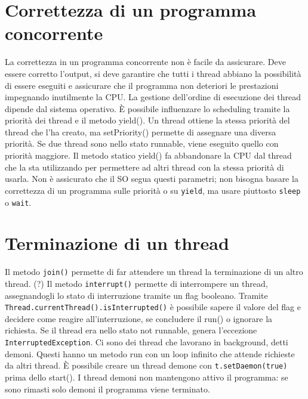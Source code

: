 \section{Correttezza di un programma concorrente}
La correttezza in un programma concorrente non è facile da assicurare. Deve essere corretto l'output, si deve garantire che tutti i thread abbiano la possibilità di essere eseguiti e assicurare che il programma non deteriori le prestazioni impegnando inutilmente la CPU.
La gestione dell'ordine di esecuzione dei thread dipende dal sistema operativo. È possibile influenzare lo scheduling tramite la priorità dei thread e il metodo yield().
Un thread ottiene la stessa priorità del thread che l'ha creato, ma setPriority() permette di assegnare una diversa priorità. Se due thread sono nello stato runnable, viene eseguito quello con priorità maggiore.
Il metodo statico yield() fa abbandonare la CPU dal thread che la sta utilizzando per permettere ad altri thread con la stessa priorità di usarla.
Non è assicurato che il SO segua questi parametri; non bisogna basare la correttezza di un programma sulle priorità o su \texttt{yield}, ma usare piuttosto \texttt{sleep} o \texttt{wait}.

\section{Terminazione di un thread}
Il metodo \texttt{join()}  permette di far attendere un thread la terminazione di un altro thread. (?)
Il metodo \texttt{interrupt()} permette di interrompere un thread, assegnandogli lo stato di interruzione tramite un flag booleano. Tramite \texttt{Thread.currentThread().isInterrupted()} è possibile sapere il valore del flag e decidere come reagire all'interruzione, se concludere il run() o ignorare la richiesta. Se il thread era nello stato not runnable, genera l'eccezione \texttt{InterruptedException}.
Ci sono dei thread che lavorano in background, detti demoni. Questi hanno un metodo run con un loop infinito che attende richieste da altri thread. È possibile creare un thread demone con \texttt{t.setDaemon(true)} prima dello start(). I thread demoni non mantengono attivo il programma: se sono rimasti solo demoni il programma viene terminato.

